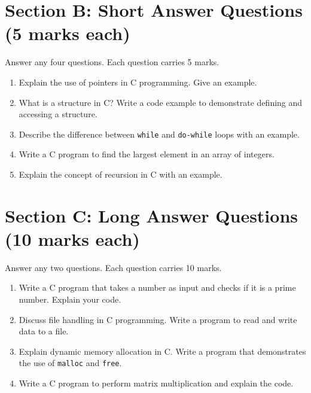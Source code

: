 \documentclass[12pt, a4paper]{article}
\begin{document}
\section*{Section B: Short Answer Questions (5 marks each)}
Answer any four questions. Each question carries 5 marks.

\begin{enumerate}
    \item Explain the use of pointers in C programming. Give an example.
    \item What is a structure in C? Write a code example to demonstrate defining and accessing a structure.
    \item Describe the difference between \texttt{while} and \texttt{do-while} loops with an example.
    \item Write a C program to find the largest element in an array of integers.
    \item Explain the concept of recursion in C with an example.
   
\end{enumerate}


\section*{Section C: Long Answer Questions (10 marks each)}
Answer any two questions. Each question carries 10 marks.

\begin{enumerate}
    \item Write a C program that takes a number as input and checks if it is a prime number. Explain your code.
    \item Discuss file handling in C programming. Write a program to read and write data to a file.
    \item Explain dynamic memory allocation in C. Write a program that demonstrates the use of \texttt{malloc} and \texttt{free}.
    \item Write a C program to perform matrix multiplication and explain the code.
   
\end{enumerate}
\end{document}
